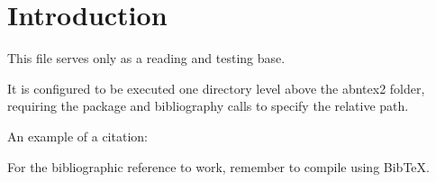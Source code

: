 \section{Introduction}
This file serves only as a reading and testing base. 

It is configured to be executed one directory level above the abntex2 folder, requiring the package and bibliography calls to specify the relative path.

An example of a citation: \cite{knuth84}

For the bibliographic reference to work, remember to compile using BibTeX.
